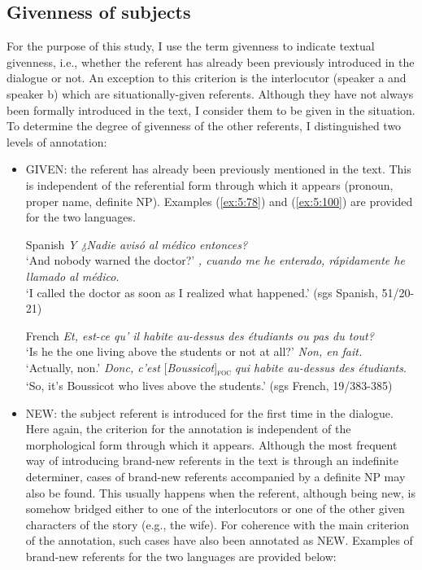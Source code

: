 \subsection{Givenness of subjects}
For the purpose of this study, I use the term givenness to indicate textual givenness, i.e., whether the referent has already been previously introduced in the dialogue or not. An exception to this criterion is the interlocutor (speaker a and speaker b) which are situationally-given referents. Although they have not always been formally introduced in the text, I consider them to be given in the situation. To determine the degree of givenness of the other referents, I distinguished two levels of annotation: 
\begin{itemize}
    \item {\selectfont GIVEN}: the referent has already been previously mentioned in the text. This is independent of the referential form through which it appears (pronoun, proper name, definite NP). Examples (\ref{ex:5:78}) and (\ref{ex:5:100}) are provided for the two languages.

\ea \label{ex:5:78} Spanish
\ea 	\textit{Y ¿Nadie avisó al médico entonces?}\\
 `And nobody warned the doctor?'
\normalsize\textit{, cuando me he enterado, rápidamente he llamado al médico}.\\
`I called the doctor as soon as I realized what happened.' \hfill (sgs Spanish, 51/20-21)     
\z \z

\ea \label{ex:5:100} French
\ea \textit{Et, est-ce qu' il habite au-dessus des étudiants ou pas du tout?}\\
 `Is he the one living above the students or not at all?'
\ex \textit{Non, en fait.}\\    
`Actually, non.'
 \textit{Donc, c'est} {[\textit{Boussicot}]\textsubscript{\textsc{foc}}} \normalsize \textit{qui habite au-dessus des étudiants}.\\
`So, it's Boussicot who lives above the students.' \hfill (sgs French, 19/383-385)     
\z \z 

\item {\selectfont NEW}: the subject referent is introduced for the first time in the dialogue. Here again, the criterion for the annotation is independent of the morphological form through which it appears. Although the most frequent way of introducing brand-new referents in the text is through an indefinite determiner, cases of brand-new referents accompanied by a definite NP may also be found. This usually happens when the referent, although being new, is somehow bridged either to one of the interlocutors or one of the other given characters of the story (e.g., the wife). For coherence with the main criterion of the annotation, such cases have also been annotated as {\selectfont NEW}. Examples of brand-new referents for the two languages are provided below:


\end{itemize}
